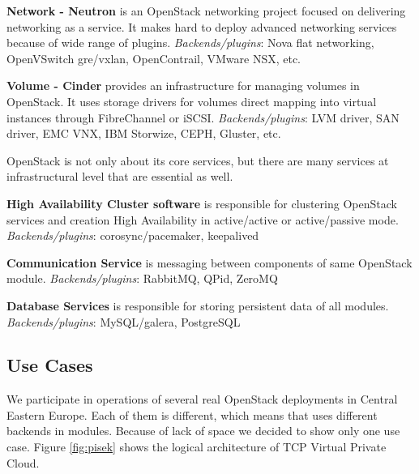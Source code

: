 \textbf{Network - Neutron} is an OpenStack networking project focused on delivering networking as a service. It makes hard to deploy advanced networking services because of wide range of plugins.
\textit{Backends/plugins}: Nova flat networking, OpenVSwitch gre/vxlan, OpenContrail, VMware NSX, etc.

\textbf{Volume - Cinder} provides an infrastructure for managing volumes in OpenStack. It uses storage drivers for volumes direct mapping into virtual instances through FibreChannel or iSCSI. 
\textit{Backends/plugins}: LVM driver, SAN driver, EMC VNX, IBM Storwize, CEPH, Gluster, etc.

OpenStack is not only about its core services, but there are many services at infrastructural level that are essential as well.

\textbf{High Availability Cluster software} is responsible for clustering OpenStack services and creation High Availability in active/active or active/passive mode.
\textit{Backends/plugins}: corosync/pacemaker, keepalived

\textbf{Communication Service} is messaging between components of same OpenStack module.
\textit{Backends/plugins}: RabbitMQ, QPid, ZeroMQ

\textbf{Database Services} is responsible for storing persistent data of all modules.
\textit{Backends/plugins}: MySQL/galera, PostgreSQL


\subsection{Use Cases}

We participate in operations of several real OpenStack deployments in Central Eastern Europe. Each of them is different, which means that uses different backends in modules.
Because of lack of space we decided to show only one use case. Figure \ref{fig:pisek} shows the logical architecture of TCP Virtual Private Cloud.


